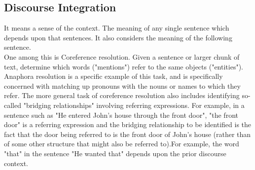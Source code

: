 \subsection{Discourse Integration}
It means a sense of the context. The meaning of any single sentence which depends upon that sentences. It also considers the meaning of the following sentence.\\ One among this is Coreference resolution. Given a sentence or larger chunk of text, determine which words ("mentions") refer to the same objects ("entities"). Anaphora resolution is a specific example of this task, and is specifically concerned with matching up pronouns with the nouns or names to which they refer. The more general task of coreference resolution also includes identifying so-called "bridging relationships" involving referring expressions. For example, in a sentence such as "He entered John's house through the front door", "the front door" is a referring expression and the bridging relationship to be identified is the fact that the door being referred to is the front door of John's house (rather than of some other structure that might also be referred to).For example, the word "that" in the sentence "He wanted that" depends upon the prior discourse context.

